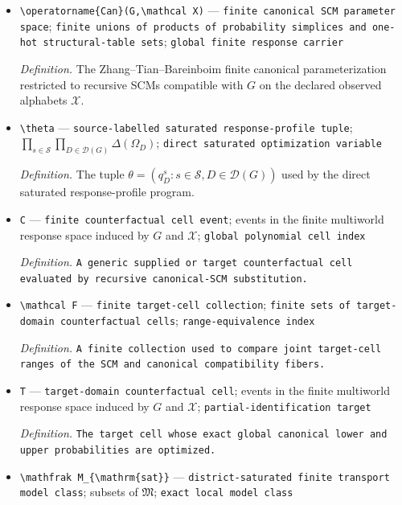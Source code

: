 \documentclass{article}
\begin{document}
\begin{itemize}
  \item \texttt{\textbackslash{}\allowbreak{}operatorname\{Can\}\allowbreak{}(G,\allowbreak{}\textbackslash{}\allowbreak{}mathcal X)} --- \texttt{finite canonical SCM parameter space}; \texttt{finite unions of products of probability simplices and one-\allowbreak{}hot structural-\allowbreak{}table sets}; \texttt{global finite response carrier}
  \par\smallskip\noindent\emph{Definition.} The Zhang--Tian--Bareinboim finite canonical parameterization restricted to recursive SCMs compatible with \(G\) on the declared observed alphabets \(\mathcal X\).
  \item \texttt{\textbackslash{}\allowbreak{}theta} --- \texttt{source-\allowbreak{}labelled saturated response-\allowbreak{}profile tuple}; \(\prod_{s\in\mathcal S}\prod_{D\in\mathcal D(G)}\Delta(\Omega_D)\); \texttt{direct saturated optimization variable}
  \par\smallskip\noindent\emph{Definition.} The tuple \(\theta=(q_D^s:s\in\mathcal S,D\in\mathcal D(G))\) used by the direct saturated response-profile program.
  \item \texttt{C} --- \texttt{finite counterfactual cell event}; events in the finite multiworld response space induced by \(G\) and \(\mathcal X\); \texttt{global polynomial cell index}
  \par\smallskip\noindent\emph{Definition.} \texttt{A generic supplied or target counterfactual cell evaluated by recursive canonical-\allowbreak{}SCM substitution.}
  \item \texttt{\textbackslash{}\allowbreak{}mathcal F} --- \texttt{finite target-\allowbreak{}cell collection}; \texttt{finite sets of target-\allowbreak{}domain counterfactual cells}; \texttt{range-\allowbreak{}equivalence index}
  \par\smallskip\noindent\emph{Definition.} \texttt{A finite collection used to compare joint target-\allowbreak{}cell ranges of the SCM and canonical compatibility fibers.}
  \item \texttt{T} --- \texttt{target-\allowbreak{}domain counterfactual cell}; events in the finite multiworld response space induced by \(G\) and \(\mathcal X\); \texttt{partial-\allowbreak{}identification target}
  \par\smallskip\noindent\emph{Definition.} \texttt{The target cell whose exact global canonical lower and upper probabilities are optimized.}
  \item \texttt{\textbackslash{}\allowbreak{}mathfrak M\_\allowbreak{}\{\textbackslash{}\allowbreak{}mathrm\{sat\}\allowbreak{}\}\allowbreak{}} --- \texttt{district-\allowbreak{}saturated finite transport model class}; subsets of \(\mathfrak M\); \texttt{exact local model class}

\end{itemize}
\end{document}
